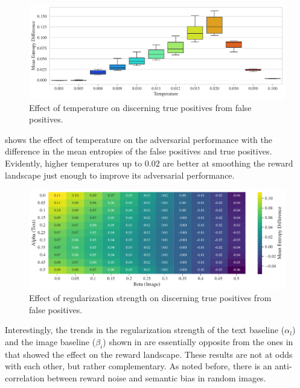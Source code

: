 \begin{figure}[H]
    \centering
    \includegraphics[width=\textwidth]{images/temperature_adversarial.pdf}
    \caption{Effect of temperature on discerning true positives from false positives.}
    \label{fig:clip-temperature-adversarial}
\end{figure}

 shows the effect of temperature on the adversarial performance with the difference in the mean entropies of the false positives and true positives.
Evidently, higher temperatures up to \(0.02\) are better at smoothing the reward landscape just enough to improve its adversarial performance.

\begin{figure}[H]
    \centering
    \includegraphics[width=\textwidth]{images/alpha_beta_adversarial.pdf}
    \caption{Effect of regularization strength on discerning true positives from false positives.}
    \label{fig:clip-alpha-beta-adversarial}
\end{figure}

Interestingly, the trends in the regularization strength of the text baseline (\(\alpha_{l}\)) and the image baseline (\(\beta_{i}\)) shown in  are essentially opposite from the ones in  that showed the effect on the reward landscape.
These results are not at odds with each other, but rather complementary. 
As noted before, there is an anti-correlation between reward noise and semantic bias in random images.

